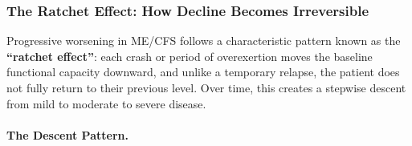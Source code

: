 \subsubsection{The Ratchet Effect: How Decline Becomes Irreversible}
\label{sec:ratchet-effect}

Progressive worsening in ME/CFS follows a characteristic pattern known as the \textbf{``ratchet effect''}: each crash or period of overexertion moves the baseline functional capacity downward, and unlike a temporary relapse, the patient does not fully return to their previous level. Over time, this creates a stepwise descent from mild to moderate to severe disease.

\paragraph{The Descent Pattern.}


